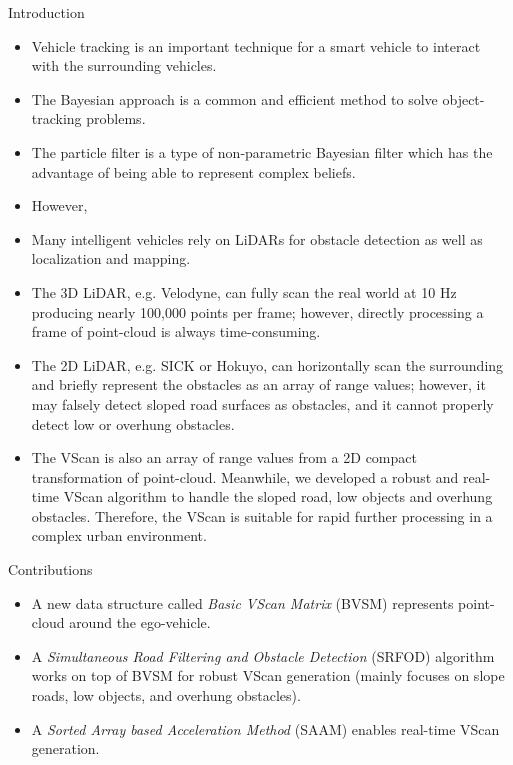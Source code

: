 \documentclass[final,hyperref={pdfpagelabels=false}]{beamer}
\begin{document}
\begin{frame}[t]
\begin{columns}[t]
\begin{column}{0.47\textwidth}
            
\begin{block}{Introduction}

\begin{itemize}
\item Vehicle tracking is an important technique for a smart vehicle to interact with the surrounding vehicles.
\item The Bayesian approach is a common and efficient method to solve object-tracking problems.
\item The particle filter is a type of non-parametric Bayesian filter which has the advantage of being able to represent complex beliefs.
\item However, 


\item Many intelligent vehicles rely on LiDARs for obstacle detection as well as localization and mapping.
\item The 3D LiDAR, e.g. Velodyne, can fully scan the real world at 10 Hz producing nearly 100,000 points per frame; however, directly processing a frame of point-cloud is always time-consuming.
\item The 2D LiDAR, e.g. SICK or Hokuyo, can horizontally scan the surrounding and briefly represent the obstacles as an array of range values; however, it may falsely detect sloped road surfaces as obstacles, and it cannot properly detect low or overhung obstacles.
\item The VScan is also an array of range values from a 2D compact transformation of point-cloud. Meanwhile, we developed a robust and real-time VScan algorithm to handle the sloped road, low objects and overhung obstacles. Therefore, the VScan is suitable for rapid further processing in a complex urban environment.
\end{itemize}

\end{block}

\begin{block}{Contributions}

\begin{itemize}
	\item A new data structure called \textit{Basic VScan Matrix} (BVSM) represents point-cloud around the ego-vehicle.
	\item A \textit{Simultaneous Road Filtering and Obstacle Detection} (SRFOD) algorithm works on top of BVSM for robust VScan generation (mainly focuses on slope roads, low objects, and overhung obstacles).
	\item A \textit{Sorted Array based Acceleration Method} (SAAM) enables real-time VScan generation.
\end{itemize}


\end{block}
\end{column}
\end{columns}
\end{frame}
\end{document}
